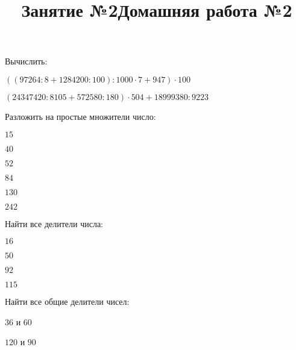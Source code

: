 \documentclass[12pt, a4paper]{article}
\begin{document}
\title{Занятие №2}
\begin{enumcols}[label=\textbf{\arabic*.}]
	\item Вычислить:
	\begin{enumcols}[itemcolumns=1]
		\item \( ((97264:8+1284200:100):1000\cdot7+947)\cdot100 \)
		\item \( (24347420:8105+572580:180)\cdot504+18999380:9223 \)
	\end{enumcols}
	\item Разложить на простые множители число:
	\begin{enumcols}[itemcolumns=6]
		\item \( 15 \)
		\item \( 40 \)
		\item \( 52 \)
		\item \( 84 \)
		\item \( 130 \)
		\item \( 242 \)
	\end{enumcols}
	\item Найти все делители числа:
	\begin{enumcols}[itemcolumns=6]
		\item \( 16 \)
		\item \( 50 \)
		\item \( 92 \)
		\item \( 115 \)
	\end{enumcols}
	\item Найти все общие делители чисел:
	\begin{enumcols}[itemcolumns=2]
		\item \( 36 \) и \( 60 \)
		\item \( 120 \) и \( 90 \)
	\end{enumcols}
\end{enumcols}
\title{Домашняя работа №2}
\end{document}
